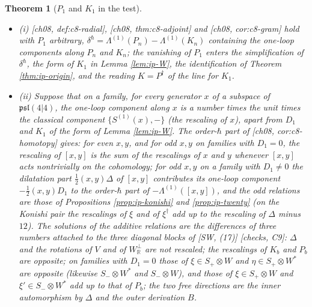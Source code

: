 \documentclass[11pt]{report}
\theoremstyle{plain}
\newtheorem{theorem}{Theorem}[chapter]
\theoremstyle{definition}
\numberwithin{equation}{chapter}
\newcommand{\Wp}{W_{\mathbb R}^\perp}
\begin{document}
\begin{theorem}[$P_1$ and $K_1$ in the test]
\label{thm:ip-P}
\begin{itemize}
\item (i) [ch08, def:c8-radial], [ch08, thm:c8-adjoint] and [ch08, cor:c8-gram] hold with $P_1$ arbitrary, $\delta^\hbar=\Lambda^{(1)}(P_n)-\Lambda^{(1)}(K_n)$ containing the one-loop components along $P_n$ and $K_n$; the vanishing of $P_1$ enters the simplification of $\delta^\hbar$, the form of $K_1$ in Lemma \ref{lem:ip-W}, the identification of Theorem \ref{thm:ip-origin}, and the reading $K=P^\dagger$ of the line for $K_1$.
\item (ii) Suppose that on a family, for every generator $x$ of a subspace of $\mathfrak{psl}(4|4)$, the one-loop component along $x$ is a number times the unit times the classical component $\{S^{(1)}(x),-\}$ (the rescaling of $x$), apart from $D_1$ and $K_1$ of the form of Lemma \ref{lem:ip-W}. The order-$\hbar$ part of [ch08, cor:c8-homotopy] gives: for even $x,y$, and for odd $x,y$ on families with $D_1=0$, the rescaling of $[x,y]$ is the sum of the rescalings of $x$ and $y$ whenever $[x,y]$ acts nontrivially on the cohomology; for odd $x,y$ on a family with $D_1\neq0$ the dilatation part $\tfrac12(x,y)\Delta$ of $[x,y]$ contributes its one-loop component $-\tfrac12(x,y)D_1$ to the order-$\hbar$ part of $-\Lambda^{(1)}([x,y])$, and the odd relations are those of Propositions \ref{prop:ip-konishi} and \ref{prop:ip-twenty} (on the Konishi pair the rescalings of $\xi$ and of $\xi^\dagger$ add up to the rescaling of $\Delta$ minus $12$). The solutions of the additive relations are the differences of three numbers attached to the three diagonal blocks of [SW, (17)] [checks, C9]: $\Delta$ and the rotations of $V$ and of $\Wp$ are not rescaled; the rescalings of $K_b$ and $P_b$ are opposite; on families with $D_1=0$ those of $\xi\in S_+\otimes W$ and $\eta\in S_+\otimes W^*$ are opposite (likewise $S_-\otimes W^*$ and $S_-\otimes W$), and those of $\xi\in S_+\otimes W$ and $\xi'\in S_-\otimes W^*$ add up to that of $P_b$; the two free directions are the inner automorphism by $\Delta$ and the outer derivation $B$.

\end{itemize}
\end{theorem}
\end{document}
